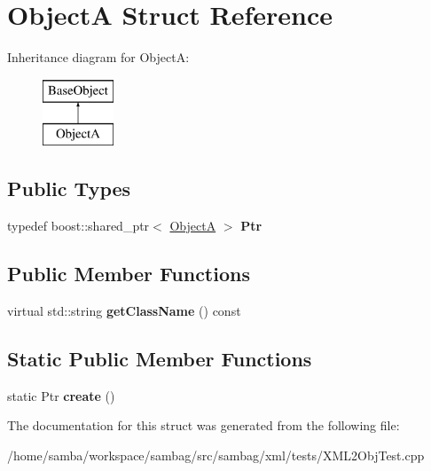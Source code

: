 \hypertarget{struct_object_a}{
\section{ObjectA Struct Reference}
\label{struct_object_a}
}
Inheritance diagram for ObjectA:\begin{figure}[H]
\begin{center}
\leavevmode
\includegraphics[height=2.000000cm]{struct_object_a}
\end{center}
\end{figure}
\subsection*{Public Types}
\begin{DoxyCompactItemize}
\item 
\hypertarget{struct_object_a_a615c39b0e253bfcad9919204c748dcd4}{
typedef boost::shared\_\-ptr$<$ \hyperlink{struct_object_a}{ObjectA} $>$ {\bfseries Ptr}}
\label{struct_object_a_a615c39b0e253bfcad9919204c748dcd4}

\end{DoxyCompactItemize}
\subsection*{Public Member Functions}
\begin{DoxyCompactItemize}
\item 
\hypertarget{struct_object_a_a533e7af50df4a23f599338ea12bf673e}{
virtual std::string {\bfseries getClassName} () const }
\label{struct_object_a_a533e7af50df4a23f599338ea12bf673e}

\end{DoxyCompactItemize}
\subsection*{Static Public Member Functions}
\begin{DoxyCompactItemize}
\item 
\hypertarget{struct_object_a_aac647760fb1d795cbd4cdc2d229d5509}{
static Ptr {\bfseries create} ()}
\label{struct_object_a_aac647760fb1d795cbd4cdc2d229d5509}

\end{DoxyCompactItemize}


The documentation for this struct was generated from the following file:\begin{DoxyCompactItemize}
\item 
/home/samba/workspace/sambag/src/sambag/xml/tests/XML2ObjTest.cpp\end{DoxyCompactItemize}
